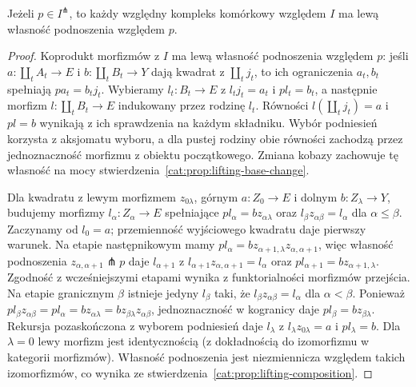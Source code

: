 \begin{lemat}\label{cat:lem:cell-lifting}
Jeżeli $p\in I^\pitchfork$, to każdy względny kompleks komórkowy względem $I$ ma lewą własność podnoszenia względem $p$.
\end{lemat}
\begin{proof}
Koprodukt morfizmów z $I$ ma lewą własność podnoszenia względem $p$: jeśli $a:\coprod_t A_t\to E$ i $b:\coprod_t B_t\to Y$ dają kwadrat z $\coprod_t j_t$, to ich ograniczenia $a_t,b_t$ spełniają $pa_t=b_tj_t$. Wybieramy $l_t:B_t\to E$ z $l_tj_t=a_t$ i $pl_t=b_t$, a następnie morfizm $l:\coprod_t B_t\to E$ indukowany przez rodzinę $l_t$. Równości $l(\coprod_t j_t)=a$ i $pl=b$ wynikają z ich sprawdzenia na każdym składniku. Wybór podniesień korzysta z aksjomatu wyboru, a dla pustej rodziny obie równości zachodzą przez jednoznaczność morfizmu z obiektu początkowego. Zmiana kobazy zachowuje tę własność na mocy stwierdzenia~\ref{cat:prop:lifting-base-change}.

Dla kwadratu z lewym morfizmem $z_{0\lambda}$, górnym $a:Z_0\to E$ i dolnym $b:Z_\lambda\to Y$, budujemy morfizmy $l_\alpha:Z_\alpha\to E$ spełniające $pl_\alpha=bz_{\alpha\lambda}$ oraz $l_\beta z_{\alpha\beta}=l_\alpha$ dla $\alpha\leq\beta$. Zaczynamy od $l_0=a$; przemienność wyjściowego kwadratu daje pierwszy warunek. Na etapie następnikowym mamy $pl_\alpha=bz_{\alpha+1,\lambda}z_{\alpha,\alpha+1}$, więc własność podnoszenia $z_{\alpha,\alpha+1}\pitchfork p$ daje $l_{\alpha+1}$ z $l_{\alpha+1}z_{\alpha,\alpha+1}=l_\alpha$ oraz $pl_{\alpha+1}=bz_{\alpha+1,\lambda}$. Zgodność z wcześniejszymi etapami wynika z funktorialności morfizmów przejścia. Na etapie granicznym $\beta$ istnieje jedyny $l_\beta$ taki, że $l_\beta z_{\alpha\beta}=l_\alpha$ dla $\alpha<\beta$. Ponieważ $pl_\beta z_{\alpha\beta}=pl_\alpha=bz_{\alpha\lambda}=bz_{\beta\lambda}z_{\alpha\beta}$, jednoznaczność w kogranicy daje $pl_\beta=bz_{\beta\lambda}$. Rekursja pozaskończona z wyborem podniesień daje $l_\lambda$ z $l_\lambda z_{0\lambda}=a$ i $pl_\lambda=b$. Dla $\lambda=0$ lewy morfizm jest identycznością (z dokładnością do izomorfizmu w kategorii morfizmów). Własność podnoszenia jest niezmiennicza względem takich izomorfizmów, co wynika ze stwierdzenia~\ref{cat:prop:lifting-composition}.
\end{proof}


